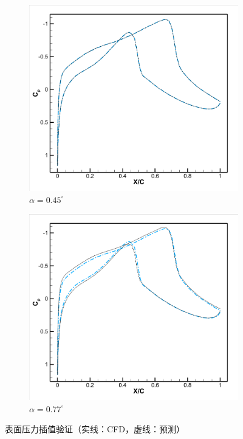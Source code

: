 \begin{figure}[H]
    \centering
    \begin{subfigure}[b]{0.45\textwidth}
        \includegraphics[width=\textwidth]{image/表面压力对比图/压力分布对比图0.45.png}
        \caption{$\alpha=0.45^\circ$}
    \end{subfigure}
    \begin{subfigure}[b]{0.45\textwidth}
        \includegraphics[width=\textwidth]{image/表面压力对比图/压力分布对比图0.77.png}
        \caption{$\alpha=0.77^\circ$}
    \end{subfigure}
    \caption{\songti 表面压力插值验证（实线：CFD，虚线：预测）}
    \label{fig:surface_validation}
\end{figure}

